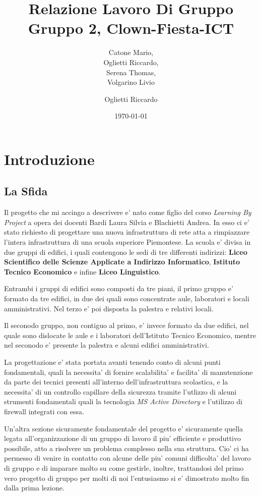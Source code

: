 \documentclass{report}
\author{Catone Mario,\\
	Oglietti Riccardo,\\
	Serena Thomas,\\
Volgarino Livio}
\title{Relazione Lavoro Di Gruppo\\
\large Gruppo 2, Clown-Fiesta-ICT}
\date{\today}
\begin{document}
	\maketitle
	\tableofcontents
	\chapter{Introduzione}
	\author{Oglietti Riccardo}
		\section{La Sfida}
			Il progetto che mi accingo a descrivere e' nato come figlio del corso \emph{Learning By Project} a opera dei docenti 
			Bardi Laura Silvia e Blachietti Andrea. In esso ci e' stato richiesto di progettare una nuova infrastruttura di 
			rete atta a rimpiazzare l'intera infrastruttura di una scuola superiore Piemontese. La scuola e' divisa in due 
			gruppi di edifici, i quali contengono le sedi di tre differenti indirizzi: \textbf{Liceo Scientifico delle Scienze 
			Applicate a Indirizzo Informatico}, \textbf{Istituto Tecnico Economico} e infine \textbf{Liceo Linguistico}.

			Entrambi i gruppi di edifici sono composti da tre piani, il primo gruppo e' formato da tre edifici, in due 
			dei quali sono concentrate aule, laboratori e locali amministrativi. Nel terzo e' poi disposta la palestra
			e relativi locali.

			Il seconodo gruppo, non contiguo al primo, e' invece formato da due edifici, nel quale sono dislocate le aule e 
			i laboratori dell'Istituto Tecnico Economico, mentre nel seconodo e' presente la palestra e alcuni edifici
			amministrativi.

			La progettazione e' stata portata avanti tenendo conto di alcuni punti fondamentali, quali la necessita' di 
			fornire scalabilita' e facilita' di manutenzione da parte dei tecnici presenti all'interno dell'infrastruttura 
			scolastica, e la necessita' di un controllo capillare della sicurezza tramite l'utlizzo di alcuni strumenti 
			fondamentali quali la tecnologia \emph{MS Active Directory} e l'utilizzo di firewall integrati con essa. 

			Un'altra sezione sicuramente fondamentale del progetto e' sicuramente quella legata all'organizzazione di un 
			gruppo di lavoro il piu' efficiente e produttivo possibile, atto a risolvere un problema complesso nella sua 
			struttura. Cio' ci ha permesso di venire in contatto con alcune delle piu' comuni difficolta' del lavoro di
			gruppo e di imparare molto su come gestirle, inoltre, trattandosi del primo vero progetto di gruppo per molti
			di noi l'entusiasmo si e' dimostrato molto fin dalla prima lezione.
\end{document}
